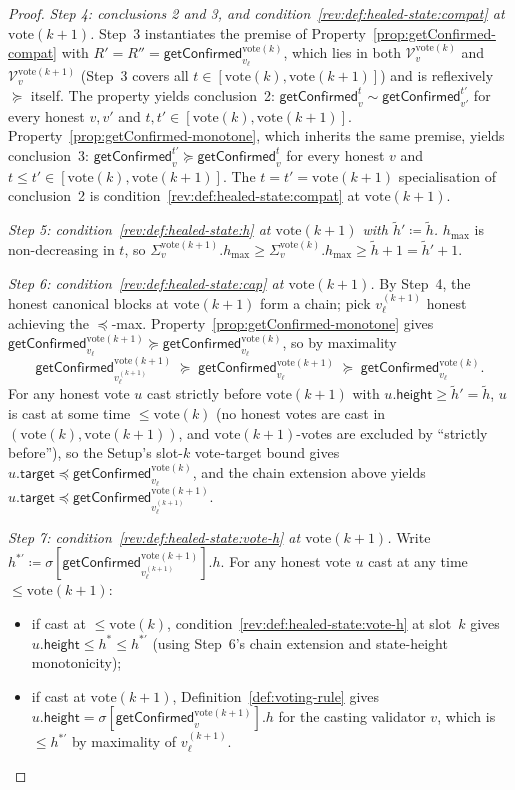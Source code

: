 \documentclass{article}
\newcommand{\V}[0]{\ensuremath{\mathcal{V}}}
\newcommand{\target}{\mathsf{target}}
\newcommand{\height}{\mathsf{height}}
\newcommand{\hmax}{\ensuremath{h_{\max}}\xspace}
\newcommand{\vote}{\ensuremath{\mathrm{vote}}}
\newcommand{\comm}[1]{\ensuremath{\widetilde{#1}}}
\newcommand{\getConfirmed}{\textsf{getConfirmed}\xspace}
\theoremstyle{plain}
\theoremstyle{definition}
\theoremstyle{remark}
\begin{document}
\begin{proof}
\medskip

\emph{Step 4: conclusions 2 and 3, and condition~\ref{rev:def:healed-state:compat} at $\vote(k{+}1)$.}
Step~3 instantiates the premise of Property~\ref{prop:getConfirmed-compat} with $R' = R'' = \getConfirmed_{v_\ell}^{\vote(k)}$, which lies in both $\V_v^{\vote(k)}$ and $\V_v^{\vote(k+1)}$ (Step~3 covers all $t \in [\vote(k), \vote(k{+}1)]$) and is reflexively $\succeq$ itself.
The property yields conclusion~2: $\getConfirmed_v^t \sim \getConfirmed_{v'}^{t'}$ for every honest $v, v'$ and $t, t' \in [\vote(k), \vote(k{+}1)]$.
Property~\ref{prop:getConfirmed-monotone}, which inherits the same premise, yields conclusion~3: $\getConfirmed_v^{t'} \succeq \getConfirmed_v^t$ for every honest $v$ and $t \leq t' \in [\vote(k), \vote(k{+}1)]$.
The $t = t' = \vote(k{+}1)$ specialisation of conclusion~2 is condition~\ref{rev:def:healed-state:compat} at $\vote(k{+}1)$.

\emph{Step 5: condition~\ref{rev:def:healed-state:h} at $\vote(k{+}1)$ with $\comm{h}' \coloneqq \comm{h}$.}
$\hmax$ is non-decreasing in $t$, so $\Sigma_v^{\vote(k+1)}.\hmax \geq \Sigma_v^{\vote(k)}.\hmax \geq \comm{h} + 1 = \comm{h}' + 1$.

\emph{Step 6: condition~\ref{rev:def:healed-state:cap} at $\vote(k{+}1)$.}
By Step~4, the honest canonical blocks at $\vote(k{+}1)$ form a chain; pick $v_\ell^{(k+1)}$ honest achieving the $\preceq$-max.
Property~\ref{prop:getConfirmed-monotone} gives $\getConfirmed_{v_\ell}^{\vote(k+1)} \succeq \getConfirmed_{v_\ell}^{\vote(k)}$, so by maximality
\[
  \getConfirmed_{v_\ell^{(k+1)}}^{\vote(k+1)} \;\succeq\; \getConfirmed_{v_\ell}^{\vote(k+1)} \;\succeq\; \getConfirmed_{v_\ell}^{\vote(k)}.
\]
For any honest vote $u$ cast strictly before $\vote(k{+}1)$ with $u.\height \geq \comm{h}' = \comm{h}$, $u$ is cast at some time $\leq \vote(k)$ (no honest votes are cast in $(\vote(k), \vote(k{+}1))$, and $\vote(k{+}1)$-votes are excluded by ``strictly before''), so the Setup's slot-$k$ vote-target bound gives $u.\target \preceq \getConfirmed_{v_\ell}^{\vote(k)}$, and the chain extension above yields $u.\target \preceq \getConfirmed_{v_\ell^{(k+1)}}^{\vote(k+1)}$.

\emph{Step 7: condition~\ref{rev:def:healed-state:vote-h} at $\vote(k{+}1)$.}
Write $h^{\ast\prime} \coloneqq \sigma[\getConfirmed_{v_\ell^{(k+1)}}^{\vote(k+1)}].h$.
For any honest vote $u$ cast at any time $\leq \vote(k{+}1)$:
\begin{itemize}
  \item if cast at $\leq \vote(k)$, condition~\ref{rev:def:healed-state:vote-h} at slot~$k$ gives $u.\height \leq h^\ast \leq h^{\ast\prime}$ (using Step~6's chain extension and state-height monotonicity);
  \item if cast at $\vote(k{+}1)$, Definition~\ref{def:voting-rule} gives $u.\height = \sigma[\getConfirmed_{v}^{\vote(k+1)}].h$ for the casting validator $v$, which is $\leq h^{\ast\prime}$ by maximality of $v_\ell^{(k+1)}$.
\end{itemize}
\end{proof}
\end{document}
